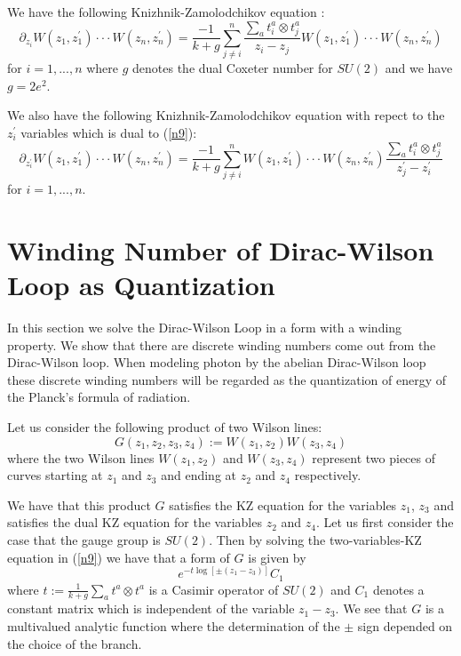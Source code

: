 \documentclass[a4paper,a4paper]{article}
\begin{document}
We have the following
Knizhnik-Zamolodchikov equation \cite{Fra} \cite{Fuc}\cite{Ng}:
\begin{equation}
\partial_{z_i}
 W(z_1, z_1^{\prime})\cdot\cdot\cdot 
W(z_n, z_n^{\prime})
=\frac{-1}{k+g}
\sum_{j\neq i}^{n}
\frac{\sum_a t_i^a \otimes t_j^a}{z_i-z_j}
 W(z_1, z_1^{\prime})\cdot\cdot\cdot 
W(z_n, z_n^{\prime})
\label{n9}
\end{equation}
for $i=1, ..., n$
where $g$ denotes the dual Coxeter number for $SU(2)$ and we have $g=2e^2$. 

 We also have the following Knizhnik-Zamolodchikov equation with repect to
the $z_i^{\prime}$ variables which is dual to (\ref{n9}):
\begin{equation}
\partial_{z_i^{\prime}}
 W(z_1,z_1^{\prime})\cdot\cdot\cdot W(z_n,z_n^{\prime})
= \frac{-1}{k+g}\sum_{j\neq i}^{n}
 W(z_1, z_1^{\prime})\cdot\cdot\cdot 
W(z_n, z_n^{\prime})
\frac{\sum_a t_i^a\otimes t_j^a}{z_j^{\prime}-z_i^{\prime}}
\label{d8}
\end{equation}
for $i=1, ..., n$.

\section{Winding Number of Dirac-Wilson Loop as Quantization}\label{sec8a}

In this section we solve the Dirac-Wilson Loop in a form with a winding property. We show that there are discrete winding numbers come out from the Dirac-Wilson loop. When modeling photon by the abelian Dirac-Wilson loop these discrete winding numbers will be regarded as the quantization of energy of the Planck's formula of radiation.

Let us consider the following product of two
Wilson lines:
\begin{equation}
G(z_1,z_2, z_3, z_4):=
 W(z_1, z_2)W(z_3, z_4)
\label{m1}
\end{equation}
where the two Wilson lines $W(z_1, z_2)$ and 
$W(z_3, z_4)$ represent two pieces
of curves starting at $z_1$ and $z_3$ and ending at
$z_2$ and $z_4$ respectively. 

We have that this product $G$ satisfies the KZ equation for the
variables $z_1$, $z_3$ and satisfies the dual KZ equation
for the variables $z_2$ and $z_4$.
Let us first consider the case that the gauge group is $SU(2)$.
Then by solving the two-variables-KZ equation in (\ref{n9}) we have that a form of $G$ is 
given by \cite{Chari}\cite{Koh}\cite{Dri}
\begin{equation}
e^{-t\log [\pm (z_1-z_3)]}C_1
\label{m2}
\end{equation}
where $t:=\frac{1}{k+g}\sum_a t^a \otimes t^a$ is a Casimir operator of $SU(2)$ and $C_1$ denotes a constant matrix which is independent
of the variable $z_1-z_3$.
We see that $G$ is a multivalued analytic function
where the determination of the $\pm$ sign depended on the choice of the
branch.
\end{document}

